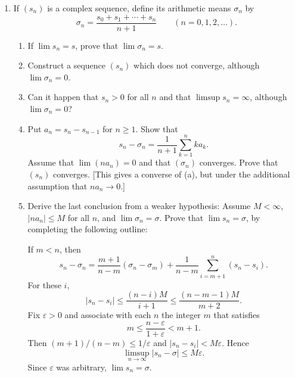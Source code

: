 \begin{enumerate}[label=\textbf{3.\arabic*.}, leftmargin=3.0em, itemsep=9pt,
                  topsep=8pt, labelsep=0.5em]
\item If $(s_n)$ is a complex sequence, define its arithmetic means
$\sigma_n$ by
\[ \sigma_n = \frac{s_0 + s_1 + \cdots + s_n}{n+1} \qquad (n = 0,1,2,\dots). \]
\begin{enumerate}[label=(\alph*), leftmargin=2.2em, itemsep=3pt, topsep=3pt]
  \item If $\lim s_n = s$, prove that $\lim \sigma_n = s$.
  \item Construct a sequence $(s_n)$ which does not converge, although
        $\lim \sigma_n = 0$.
  \item Can it happen that $s_n > 0$ for all $n$ and that
        $\limsup s_n = \infty$, although $\lim \sigma_n = 0$?
  \item Put $a_n = s_n - s_{n-1}$ for $n \ge 1$. Show that
        \[ s_n - \sigma_n = \frac{1}{n+1}\sum_{k=1}^{n} ka_k. \]
        Assume that $\lim (na_n) = 0$ and that $(\sigma_n)$ converges. Prove
        that $(s_n)$ converges. [This gives a converse of (a), but under the
        additional assumption that $na_n \to 0$.]
  \item Derive the last conclusion from a weaker hypothesis: Assume
        $M < \infty$, $|na_n| \le M$ for all $n$, and
        $\lim \sigma_n = \sigma$. Prove that $\lim s_n = \sigma$, by
        completing the following outline:

        If $m < n$, then
        \[ s_n - \sigma_n = \frac{m+1}{n-m}(\sigma_n - \sigma_m)
           + \frac{1}{n-m}\sum_{i=m+1}^{n} (s_n - s_i). \]
        For these $i$,
        \[ |s_n - s_i| \le \frac{(n-i)M}{i+1} \le \frac{(n-m-1)M}{m+2}. \]
        Fix $\varepsilon > 0$ and associate with each $n$ the integer $m$ that
        satisfies
        \[ m \le \frac{n-\varepsilon}{1+\varepsilon} < m+1. \]
        Then $(m+1)/(n-m) \le 1/\varepsilon$ and $|s_n - s_i| < M\varepsilon$.
        Hence
        \[ \limsup_{n\to\infty} |s_n - \sigma| \le M\varepsilon. \]
        Since $\varepsilon$ was arbitrary, $\lim s_n = \sigma$.
\end{enumerate}


\end{enumerate}
